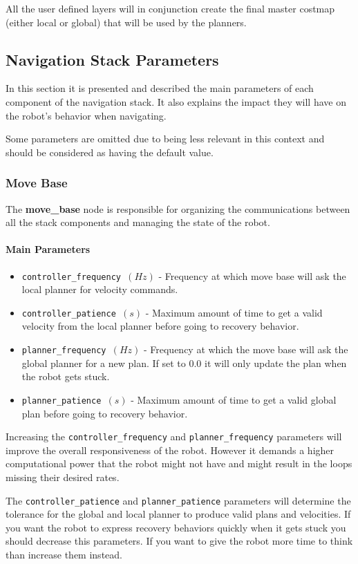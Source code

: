\documentclass[12pt]{article}
\begin{document}
All the user defined layers will in conjunction create the final master costmap (either local or global) that will be used by the planners.


\subsection{Navigation Stack Parameters}
In this section it is presented and described the main parameters of each component of the navigation stack. It also explains the impact they will have on the robot's behavior when navigating.

Some parameters are omitted due to being less relevant in this context and should be considered as having the default value.
\subsubsection{Move Base}
The \textbf{move\_base} node is responsible for organizing the communications between all the stack components and managing the state of the robot.
\paragraph{Main Parameters \cite{movebase}}
\begin{itemize}[label={}]
    \item \texttt{controller\_frequency $(Hz)$} - Frequency at which move base will ask the local planner for velocity commands.
    \item \texttt{controller\_patience $(s)$} - Maximum amount of time to get a valid velocity from the local planner before going to recovery behavior.
    \item \texttt{planner\_frequency $(Hz)$} - Frequency at which the move base will ask the global planner for a new plan. If set to 0.0 it will only update the plan when the robot gets stuck.
    \item \texttt{planner\_patience $(s)$} - Maximum amount of time to get a valid global plan before going to recovery behavior.
\end{itemize}

Increasing the \texttt{controller\_frequency} and \texttt{planner\_frequency} parameters will improve the overall responsiveness of the robot. However it demands a higher computational power that the robot might not have and might result in the loops missing their desired rates.

The \texttt{controller\_patience} and \texttt{planner\_patience} parameters will determine the tolerance for the global and local planner to produce valid plans and velocities. If you want the robot to express recovery behaviors quickly when it gets stuck you should decrease this parameters. If you want to give the robot more time to think than increase them instead.
\end{document}
